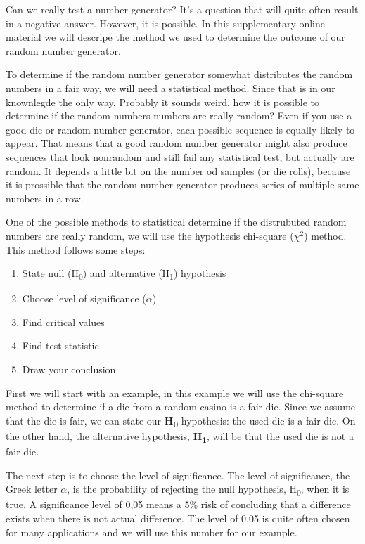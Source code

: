 Can we really test a number generator? It's a question that will quite often result in a negative answer. However, it is possible. In this supplementary online material we will descripe the method we used to determine the outcome of our random number generator.

To determine if the random number generator somewhat distributes the random numbers in a fair way, we will need a statistical method. Since that is in our knownlegde the only way. Probably it sounds weird, how it is possible to determine if the random numbers numbers are really random? Even if you use a good die or random number generator, each possible sequence is equally likely to appear. That means that a good random number generator might also produce sequences that look nonrandom and still fail any statistical test, but actually are random. It depends a little bit on the number od samples (or die rolls), because it is prossible that the random number generator produces series of multiple same numbers in a row.

One of the possible methods to statistical determine if the distrubuted random numbers are really random, we will use the hypothesis chi-square (${\chi}^2$) method. This method follows some steps:

\begin{enumerate}
	\itemsep0em
	\item State null (H\textsubscript{0}) and alternative (H\textsubscript{1}) hypothesis
	\item Choose level of significance ($\alpha$)
	\item Find critical values 
	\item Find test statistic
	\item Draw your conclusion
\end{enumerate}


First we will start with an example, in this example we will use the chi-square method to determine if a die from a random casino is a fair die. Since we assume that the die is fair, we can state our \textbf{H\textsubscript{0}} hypothesis: the used die is a fair die. On the other hand, the alternative hypothesis, \textbf{H\textsubscript{1}}, will be that the used die is not a fair die.

The next step is to choose the level of significance. The level of significance, the Greek letter $\alpha$, is the probability of rejecting the null hypothesis, H\textsubscript{0}, when it is true. A significance level of 0,05 means a 5\% risk of concluding that a difference exists when there is not actual difference. The level of 0,05 is quite often chosen for many applications and we will use this number for our example.

